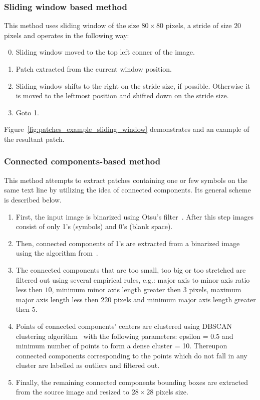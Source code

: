 \documentclass[conference,a4paper]{ieeetran}
\begin{document}
\subsubsection{Sliding window based method}
This method uses sliding window of the size $80\times 80$ pixels, a stride of size $20$ pixels and operates in the following way:
\begin{enumerate}
  \setcounter{enumi}{-1}
	\item Sliding window moved to the top left conner of the image.
	\item Patch extracted from the current window position.
	\item Sliding window shifts to the right on the stride size, if possible. Otherwise it is moved to the leftmost position and shifted down on the stride size.
	\item Goto 1.
\end{enumerate} 
Figure~\ref{fig:patches_example_sliding_window} demonstrates and an example of the resultant patch. 

\subsubsection{Connected components-based method}
This method attempts to extract patches containing one or few symbols on the same text line by utilizing the idea of connected components. Its general scheme is described below.
\begin{enumerate}
	\item First, the input image is binarized using Otsu's filter~\cite{otsu1975threshold}. After this step images consist of only 1's (symbols) and 0's (blank space).
	\item Then, connected components of 1's are extracted from a binarized image using the algorithm from~\cite{fiorio1996connected_components}. 
	\item The connected components that are too small, too big or too stretched are filtered out using several empirical rules, e.g.: major axis to minor axis ratio less then $10$, minimum minor axis length greater then $3$ pixels, maximum major axis length less then $220$ pixels and  minimum major axis length greater then 5.
	\item Points of connected components' centers are clustered using DBSCAN clustering algorithm~\cite{ester1996dbscan,GranVolk} with the following parameters: epsilon = 0.5 and minimum number of points to form a dense cluster = 10. Thereupon connected components corresponding to the points which do not fall in any cluster are labelled as outliers and filtered out.
	\item Finally, the remaining connected components bounding boxes are extracted from the source image and resized to $28\times 28$ pixels size.
\end{enumerate}
\end{document}
